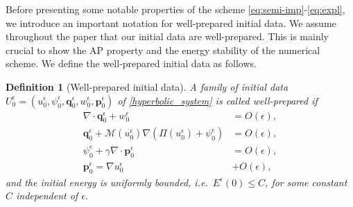 \documentclass[11pt]{article}
\numberwithin{equation}{section}
\newtheorem{counter example}[theorem]{Counter Example}
\newtheorem{definition}[theorem] {Definition}
\numberwithin{equation}{section}
\numberwithin{equation}{section}
\begin{document}
Before presenting some notable properties of the scheme \eqref{eq:semi-imp}-\eqref{eq:expl}, we introduce an important notation for well-prepared initial data. We assume throughout the paper that our initial data are well-prepared. This is mainly crucial to show the AP property and the energy stability of the numerical scheme. We define the well-prepared initial data as follows.
\begin{definition}[Well-prepared initial data]
\label{def:well-prepared_init}
A family of initial data $U_0^\epsilon
=
\left(u_0^\epsilon,\psi_0^\epsilon,\mathbf q_0^\epsilon,
w_0^\epsilon,\mathbf p_0^\epsilon\right)$ of \eqref{hyperbolic_system} is called well-prepared if
\begin{equation}\label{initial_data_hyp_relaxation}
\begin{aligned}
\nabla\cdot\mathbf q_0^\epsilon+w_0^\epsilon&=O(\epsilon),\\
\mathbf q_0^\epsilon+
\mathcal M(u_0^\epsilon)
\nabla\!\left(\Pi(u_0^\epsilon)+\psi_0^\epsilon\right)
&=O(\epsilon),\\
\psi_0^\epsilon+\gamma\nabla\cdot\mathbf p_0^\epsilon&=O(\epsilon),\\
\mathbf{p}_0^\epsilon=\nabla u_0^\epsilon&+O(\epsilon),
\end{aligned}
\end{equation}
and the initial energy is uniformly bounded, i.e.\ $E^\epsilon(0)\le C$, for some constant $C$ independent of $\epsilon$.
\end{definition}
\end{document}

